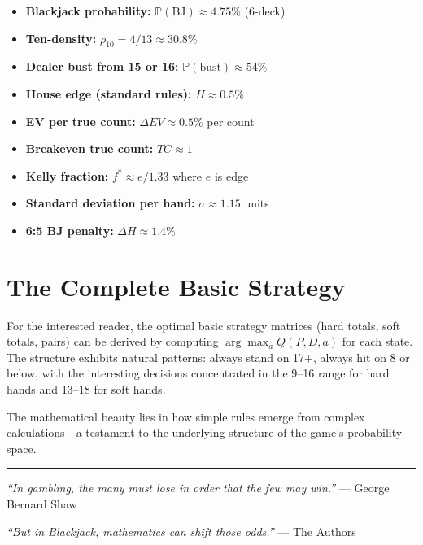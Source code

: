 \documentclass[11pt,a4paper]{article}
\theoremstyle{definition}
\newcommand{\Prob}{\mathbb{P}}
\begin{document}
\begin{itemize}
\item \textbf{Blackjack probability:} $\Prob(\text{BJ}) \approx 4.75\%$ (6-deck)

\item \textbf{Ten-density:} $\rho_{10} = 4/13 \approx 30.8\%$

\item \textbf{Dealer bust from 15 or 16:} $\Prob(\text{bust}) \approx 54\%$

\item \textbf{House edge (standard rules):} $H \approx 0.5\%$

\item \textbf{EV per true count:} $\Delta EV \approx 0.5\%$ per count

\item \textbf{Breakeven true count:} $TC \approx 1$

\item \textbf{Kelly fraction:} $f^* \approx e/1.33$ where $e$ is edge

\item \textbf{Standard deviation per hand:} $\sigma \approx 1.15$ units

\item \textbf{6:5 BJ penalty:} $\Delta H \approx 1.4\%$
\end{itemize}

\section{The Complete Basic Strategy}

For the interested reader, the optimal basic strategy matrices (hard totals, soft totals, pairs) can be derived by computing $\arg\max_a Q(P, D, a)$ for each state. The structure exhibits natural patterns: always stand on 17+, always hit on 8 or below, with the interesting decisions concentrated in the 9--16 range for hard hands and 13--18 for soft hands.

The mathematical beauty lies in how simple rules emerge from complex calculations---a testament to the underlying structure of the game's probability space.

\vspace{1em}
\hrule
\vspace{0.5em}
\textit{``In gambling, the many must lose in order that the few may win.''} --- George Bernard Shaw

\vspace{0.5em}
\textit{``But in Blackjack, mathematics can shift those odds.''} --- The Authors
\end{document}
